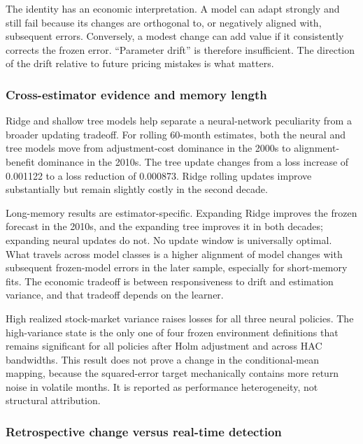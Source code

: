 

The identity has an economic interpretation. A model can adapt strongly and still fail because its changes are orthogonal to, or negatively aligned with, subsequent errors. Conversely, a modest change can add value if it consistently corrects the frozen error. ``Parameter drift'' is therefore insufficient. The direction of the drift relative to future pricing mistakes is what matters.

\subsubsection{Cross-estimator evidence and memory length}

Ridge and shallow tree models help separate a neural-network peculiarity from a broader updating tradeoff. For rolling 60-month estimates, both the neural and tree models move from adjustment-cost dominance in the 2000s to alignment-benefit dominance in the 2010s. The tree update changes from a loss increase of 0.001122 to a loss reduction of 0.000873. Ridge rolling updates improve substantially but remain slightly costly in the second decade.

Long-memory results are estimator-specific. Expanding Ridge improves the frozen forecast in the 2010s, and the expanding tree improves it in both decades; expanding neural updates do not. No update window is universally optimal. What travels across model classes is a higher alignment of model changes with subsequent frozen-model errors in the later sample, especially for short-memory fits. The economic tradeoff is between responsiveness to drift and estimation variance, and that tradeoff depends on the learner.

High realized stock-market variance raises losses for all three neural policies. The high-variance state is the only one of four frozen environment definitions that remains significant for all policies after Holm adjustment and across HAC bandwidths. This result does not prove a change in the conditional-mean mapping, because the squared-error target mechanically contains more return noise in volatile months. It is reported as performance heterogeneity, not structural attribution.

\subsubsection{Retrospective change versus real-time detection}

